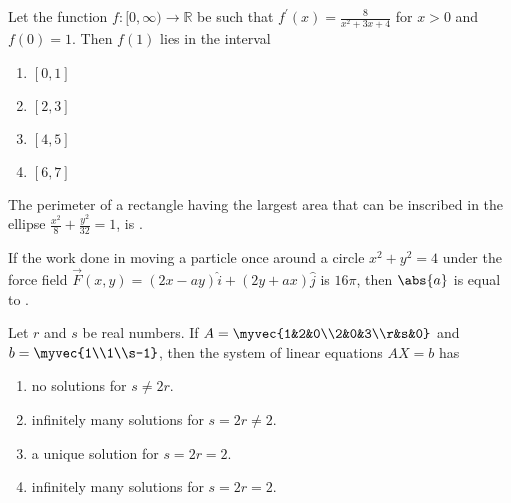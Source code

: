     \item Let the function $f:[0,\infty)\to\mathbb{R}$ be such that $f^\prime(x)=\frac{8}{x^2+3x+4}$ for $x>0$ and $f(0)=1$. Then $f(1)$ lies in the interval
        \begin{enumerate}
            \item $[0,1]$
            \item $[2,3]$
            \item $[4,5]$
            \item $[6,7]$
        \end{enumerate}

    \item The perimeter of a rectangle having the largest area that can be inscribed in the ellipse $\frac{x^2}{8}+\frac{y^2}{32}=1$, is \underline{\hspace{1.5cm}}.

    \item If the work done in moving a particle once around a circle $x^2+y^2=4$ under the force field $\vec{F}(x,y)=(2x-ay)\hat{i}+(2y+ax)\hat{j}$ is $16\pi$, then $\abs{a}$ is equal to \underline{\hspace{1.5cm}}.

    \item Let $r$ and $s$ be real numbers. If $A = \myvec{1&2&0\\2&0&3\\r&s&0}$ and $b=\myvec{1\\1\\s-1}$, then the system of linear equations $AX=b$ has
        \begin{enumerate}
            \item no solutions for $s\neq2r$.
            \item infinitely many solutions for $s=2r\neq2$.
            \item a unique solution for $s=2r=2$.
            \item infinitely many solutions for $s=2r=2$.
        \end{enumerate}

